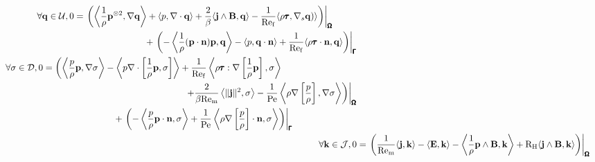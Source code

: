     \begin{align}
        \begin{split}
            \forall \mathbf{q} \in \mathcal{U},  0  &=  \left.\left(\left\langle\frac{1}{\rho}\mathbf{p}^{\otimes 2}, \nabla\mathbf{q}\right\rangle + \langle p, \nabla\cdot\mathbf{q}\rangle + \frac{2}{\beta}\langle\mathbf{j}\wedge\mathbf{B}, \mathbf{q}\rangle - \frac{1}{\mathrm{Re}_{\mathrm{f}}}\langle\rho\pmb{\mathsf{\tau}}, \nabla_{s}\mathbf{q})\rangle\right)\right|_{\pmb{\mathsf{\Omega}}}  \\
            &\;\;\;\;\;\;\;\;\;\;\;\;\;\;\;\;\;\;\;\;\;\;\;\;\;\;\;\;  + \left.\left(- \left\langle\frac{1}{\rho}(\mathbf{p}\cdot\mathbf{n})\mathbf{p}, \mathbf{q}\right\rangle - \langle p, \mathbf{q}\cdot\mathbf{n}\rangle + \frac{1}{\mathrm{Re}_{\mathrm{f}}}\langle\rho\pmb{\mathsf{\tau}}\cdot\mathbf{n}, \mathbf{q}\rangle\right)\right|_{\pmb{\mathsf{\Gamma}}}
        \end{split}  \\
        \begin{split}
            \forall \sigma \in \mathcal{D},  0  &=  \left(\left\langle\frac{p}{\rho}\mathbf{p}, \nabla\sigma\right\rangle - \left\langle p\nabla\cdot\left[\frac{1}{\rho}{\mathbf{p}}, \sigma\right]\right\rangle + \frac{1}{\mathrm{Re}_{\mathrm{f}}}\left\langle\rho\pmb{\mathsf{\tau}}:\nabla\left[\frac{1}{\rho}\mathbf{p}\right], \sigma\right\rangle\right.  \\
            &\;\;\;\;\;\;\;\;\;\;\;\;\;\;\;\;\;\;\;\;\;\;\;\;\;\;\;\;\;\;\;\;\;\;\;\;\;\;\;\;\;\;\;\;\;\;\;\;\;\;\;\;\;\;\;\;\left.\left.+ \frac{2}{\beta\mathrm{Re}_{\mathrm{m}}}\left\langle\|\mathbf{j}\|^{2}, \sigma\right\rangle - \frac{1}{\mathrm{Pe}}\left\langle\rho\nabla\left[\frac{p}{\rho}\right], \nabla\sigma\right\rangle\right)\right|_{\pmb{\mathsf{\Omega}}}  \\
            &\;\;\;\;\;\;\;\;\;\;\;\;\;\;\;\;\;\;\;\;\;\;\;\;\;\;\;\;  + \left.\left(- \left\langle\frac{p}{\rho}\mathbf{p}\cdot\mathbf{n}, \sigma\right\rangle + \frac{1}{\mathrm{Pe}}\left\langle\rho\nabla\left[\frac{p}{\rho}\right]\cdot\mathbf{n}, \sigma\right\rangle\right)\right|_{\pmb{\mathsf{\Gamma}}}
        \end{split}  \\
        \forall \mathbf{k} \in \mathcal{J},  0  &=  \left.\left(\frac{1}{\mathrm{Re}_{\mathrm{m}}}\langle\mathbf{j}, \mathbf{k}\rangle - \langle\mathbf{E}, \mathbf{k}\rangle - \left\langle\frac{1}{\rho}\mathbf{p}\wedge\mathbf{B}, \mathbf{k}\right\rangle + \mathrm{R}_{\mathrm{H}}\langle\mathbf{j}\wedge\mathbf{B}, \mathbf{k}\rangle\right)\right|_{\pmb{\mathsf{\Omega}}}  \\
    \end{align}
    